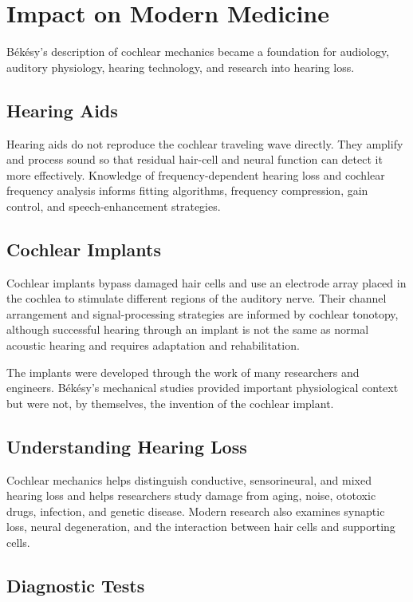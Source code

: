\section{Impact on Modern Medicine}

B\'ek\'esy's description of cochlear mechanics became a foundation for audiology, auditory physiology, hearing technology, and research into hearing loss.

\subsection{Hearing Aids}

Hearing aids do not reproduce the cochlear traveling wave directly. They amplify and process sound so that residual hair-cell and neural function can detect it more effectively. Knowledge of frequency-dependent hearing loss and cochlear frequency analysis informs fitting algorithms, frequency compression, gain control, and speech-enhancement strategies.

\subsection{Cochlear Implants}

Cochlear implants bypass damaged hair cells and use an electrode array placed in the cochlea to stimulate different regions of the auditory nerve. Their channel arrangement and signal-processing strategies are informed by cochlear tonotopy, although successful hearing through an implant is not the same as normal acoustic hearing and requires adaptation and rehabilitation.

The implants were developed through the work of many researchers and engineers. B\'ek\'esy's mechanical studies provided important physiological context but were not, by themselves, the invention of the cochlear implant.

\subsection{Understanding Hearing Loss}

Cochlear mechanics helps distinguish conductive, sensorineural, and mixed hearing loss and helps researchers study damage from aging, noise, ototoxic drugs, infection, and genetic disease. Modern research also examines synaptic loss, neural degeneration, and the interaction between hair cells and supporting cells.

\subsection{Diagnostic Tests}

